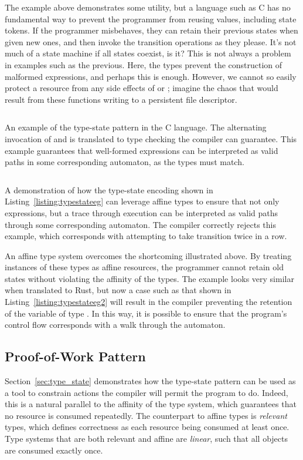 The example above demonstrates some utility, but a language such as C has no fundamental way to prevent the programmer from reusing values, including state tokens. 
If the programmer misbehaves, they can retain their previous states when given new ones, and then invoke the transition operations as they please. It's not much of a state machine if all states coexist, is it? This is not always a problem in examples such as the previous. Here, the types prevent the construction of malformed expressions, and perhaps this is enough. However, we cannot so easily protect a resource from any side effects of  or ; imagine the chaos that would result from these functions writing to a persistent file descriptor.
\begin{listing}[th]
	\inputminted[linenos,tabsize=2,breaklines,frame=lines]{c}{typestate_eg.c}
	\caption[Type state automaton in C with expressions modeling runs.]{An example of the type-state pattern in the C language. The alternating invocation of  and  is translated to type checking the compiler can guarantee. This example guarantees that well-formed expressions can be interpreted as valid paths in some corresponding automaton, as the types must match.}
	\label{listing:typestateeg}
\end{listing}
\begin{listing}[th]
\inputminted[]{rust}{typestate_eg2.rs}
\caption[Type state automaton in Rust with execution traces as runs.]{A demonstration of how the type-state encoding shown in Listing~\ref{listing:typestateeg} can leverage affine types to ensure that not only expressions, but a trace through execution can be interpreted as valid paths through some corresponding automaton. The compiler correctly rejects this example, which corresponds with attempting to take transition  twice in a row.}
\label{listing:typestateeg2}
\end{listing}

An affine type system overcomes the shortcoming illustrated above. By treating instances of these types as affine resources, the programmer cannot retain old states without violating the affinity of the types. The example looks very similar when translated to Rust, but now a case such as that shown in Listing~\ref{listing:typestateeg2} will result in the compiler preventing the retention of the variable of type . In this way, it is possible to ensure that the program's control flow corresponds with a walk through the automaton.


\subsection{Proof-of-Work Pattern}
\label{sec:proof_of_work}
Section~\ref{sec:type_state} demonstrates how the type-state pattern can be used as a tool to constrain actions the compiler will permit the program to do. Indeed, this is a natural parallel to the affinity of the type system, which guarantees that no resource is consumed repeatedly. The counterpart to affine types is \textit{relevant} types, which defines correctness as each resource being consumed at least once. Type systems that are both relevant and affine are \textit{linear}, such that all objects are consumed exactly once.

